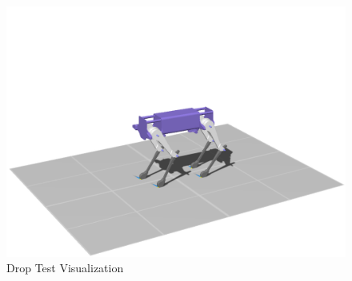 \begin{figure}[h!]
\begin{minipage}{0.32\textwidth}
            \centering
            \includegraphics[width=\textwidth]{figures/lkgdrop_3_crop.png} %
        \end{minipage}
        

    \caption{Drop Test Visualization}
    \label{fig:droplkg}

\end{figure}

